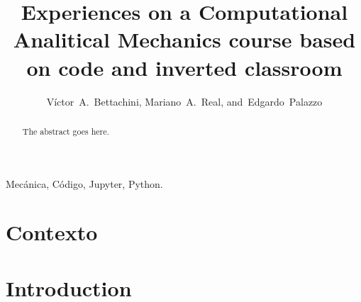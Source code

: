\documentclass[journal]{IEEEtran}
\begin{document}
\title{Experiences on a Computational Analitical Mechanics course based on code and inverted classroom}
%
%
%

\author{Víctor~A.~Bettachini,   Mariano~A.~Real,        and~Edgardo~Palazzo%
}


\maketitle

\begin{abstract}

The abstract goes here.
\end{abstract}

\begin{IEEEkeywords}
Mecánica, Código, Jupyter, Python.
\end{IEEEkeywords}

\section{Contexto}



\section{Introduction}



\end{document}
